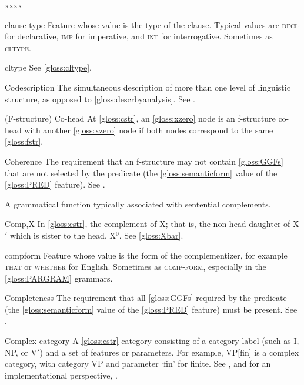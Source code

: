 \documentclass[output=paper,colorlinks,citecolor=brown]{langscibook}
\begin{document}
\begin{labeling}{xxxx}
\item[clause-type\namedlabel{gloss:cltype}{\textsc{clause-type}}] Feature whose value is the type of the clause.  Typical values are \textsc{decl} for declarative, \textsc{imp} for imperative, and \textsc{int} for interrogative.  Sometimes as \textsc{cltype}.

\item[cltype] See \ref{gloss:cltype}.

\item[Codescription\namedlabel{gloss:Codescription}{Codescription}\namedlabel{gloss:codescription}{codescription}] The simultaneous description of more than one level of linguistic structure, as opposed to \ref{gloss:descrbyanalysis}. See \citetv[\ref{sect:intro:addlevels}]{chapters/Intro}.

\item[(F-structure) Co-head\namedlabel{gloss:Cohead}{(F-structure) co-head}] At \ref{gloss:cstr}, an \ref{gloss:xzero} node is an f-structure co-head with another \ref{gloss:xzero} node if both nodes correspond to the same \ref{gloss:fstr}.

\item[Coherence\namedlabel{gloss:Coherence}{Coherence}] The requirement that an f-structure may not contain \ref{gloss:GGFs} that are not selected by the predicate (the \ref{gloss:semanticform} value of the \ref{gloss:PRED} feature).  See \citetv[\ref{sec:CoreConcepts:Coherence}]{chapters/CoreConcepts}.

\item[\COMP\namedlabel{gloss:comp}{\COMP}] A grammatical function typically associated with sentential complements.

\item[Comp,X] In \ref{gloss:cstr}, the complement of X; that is, the non-head daughter of X$'$ which is sister to the head, X$^0$.  See \ref{gloss:Xbar}.

\item[compform] Feature whose value is the form of the complementizer, for example \textsc{that} or \textsc{whether} for English.  Sometimes as \textsc{comp-form}, especially in the \ref{gloss:PARGRAM} grammars.

\item[Completeness] The requirement that all \ref{gloss:GGFs} required by the predicate (the \ref{gloss:semanticform} value of the \ref{gloss:PRED} feature) must be present.  See \citetv[\ref{sec:CoreConcepts:Completeness}]{chapters/CoreConcepts}.

\item[Complex category] A \ref{gloss:cstr} category consisting of a category label (such as I, NP, or V$'$) and a set of features or parameters.  For example, VP[fin] is a complex category, with category VP and parameter `fin' for finite.  See \citetv[\ref{sec:historical:mixed}]{chapters/Historical}, and for an implementational perspective, \citetv[\ref{sec:ImpApp:Devices}]{chapters/ImplementationsApplications}.


\end{labeling}
\end{document}
